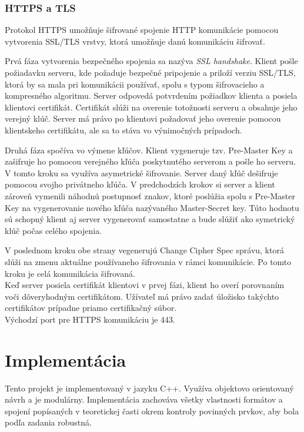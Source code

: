 \documentclass[11pt,a4paper]{article}
\begin{document}
\subsubsection{HTTPS a TLS}

Protokol HTTPS umožňuje šifrované spojenie HTTP komunikácie pomocou vytvorenia SSL/TLS vrstvy, ktorá umožňuje danú komunikáciu šifrovať.

Prvá fáza vytvorenia bezpečného spojenia sa nazýva \textit{SSL handshake}. Klient pošle požiadavku serveru, kde požaduje bezpečné pripojenie a priloží verziu SSL/TLS, ktorá by sa mala pri komunikácii používať, spolu s typom šifrovacieho a kompresného algoritmu. 
Server odpovedá potvrdením požiadkov klienta a posiela klientovi certifikát. Certifikát slúži na overenie totožnosti serveru a obsahuje jeho verejný klúč. Server má právo po klientovi požadovať jeho overenie pomocou klientskeho certifikátu, ale sa to stáva vo výnimočných prípadoch.

Druhá fáza spočíva vo výmene kľúčov. Klient vygeneruje tzv. Pre-Master Key a zašifruje ho pomocou verejného kľúča poskytnutého serverom a pošle ho serveru. V tomto kroku sa využíva asymetrické šifrovanie. Server daný kľúč dešifruje pomocou svojho privátneho kľúča.
V predchodzích krokov si server a klient zároveň vymenili náhodnú postupnosť znakov, ktoré poslúžia spolu s Pre-Master Key na vygenerovanie nového kľúča nazývaného Master-Secret key.
Túto hodnotu sú schopný klient aj server vygenerovať samostatne a bude slúžiť ako symetrický klúč počas celého spojenia.

V poslednom kroku obe strany vegenerujú Change Cipher Spec správu, ktorá slúži na zmenu aktuálne používaneho šifrovania v rámci komunikácie. Po tomto kroku je celá komunikácia šifrovaná.\\

Keď server posiela certifikát klientovi v prvej fázi, klient ho overí porovnaním voči dôveryhodným certifikátom. Užívateľ má právo zadať úložisko takýchto certifikátov prípadne priamo certifikačný súbor.\\

\noindent Východzí port pre HTTPS komunikáciu je 443.


\section{Implementácia}

Tento projekt je implementovaný v jazyku C++. Využíva objektovo orientovaný návrh a je modulárny. Implementácia zachováva všetky vlastnosti formátov a spojení popísaných v teoretickej časti okrem kontroly povinných prvkov, aby bola podľa zadania robustná.
\end{document}
